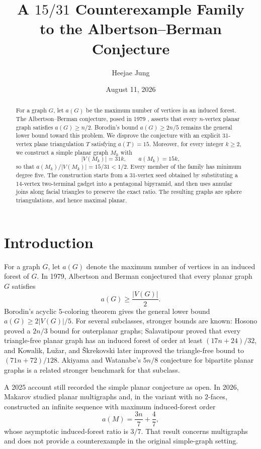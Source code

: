\documentclass[11pt]{article}
\title{A $15/31$ Counterexample Family\\
to the Albertson--Berman Conjecture}
\author{Heejae Jung}
\date{August 11, 2026}
\theoremstyle{definition}
\theoremstyle{remark}
\begin{document}
\maketitle

\begin{abstract}
For a graph $G$, let $a(G)$ be the maximum number of vertices in an induced forest.
The Albertson--Berman conjecture, posed in 1979 \cite{AlbertsonBerman1979}, asserts
that every $n$-vertex planar graph satisfies $a(G)\ge n/2$. 
Borodin's bound $a(G)\ge 2n/5$ remains the general lower bound 
toward this problem\cite{Borodin1979}.
We disprove the conjecture with an explicit 31-vertex plane 
triangulation $T$ satisfying $a(T)=15$. Moreover, for every integer
$k\ge2$, we construct a simple planar graph $M_k$ with
\[
 |V(M_k)|=31k,\qquad a(M_k)=15k,
\]
so that $a(M_k)/|V(M_k)|=15/31<1/2$.  Every member of the family has minimum
degree five.  The construction starts from a $31$-vertex seed obtained by
substituting a $14$-vertex two-terminal gadget into a pentagonal bipyramid, and
then uses annular joins along facial triangles to preserve the exact ratio.
The resulting graphs are sphere triangulations, and hence maximal planar.
\end{abstract}



\section{Introduction}
For a graph $G$, let $a(G)$ denote the maximum number of vertices in an induced
forest of $G$.  In 1979, Albertson and Berman conjectured that every planar graph
$G$ satisfies\cite{AlbertsonBerman1979}
\begin{equation}\label{eq:AB}
a(G) \ge \frac{|V(G)|}{2}.
\end{equation}
Borodin's acyclic $5$-coloring theorem gives the general lower bound
$a(G)\ge2|V(G)|/5$\cite{Borodin1979}.  For several subclasses, stronger bounds
are known: Hosono proved a $2n/3$ bound for outerplanar graphs\cite{Hosono1990};
Salavatipour proved that every triangle-free planar graph has an induced forest
of order at least $(17n+24)/32$\cite{Salavatipour2006}, and Kowalik, Lu\v{z}ar,
and \v{S}krekovski later improved the triangle-free bound to
$(71n+72)/128$\cite{KowalikLuzarSkrekovski2010}.  Akiyama and Watanabe's
$5n/8$ conjecture for bipartite planar graphs is a related stronger benchmark
for that subclass\cite{AkiyamaWatanabe1987}.

A 2025 account still recorded the simple planar conjecture as
open\cite{EnamiMatsumotoYashima2025}.  In 2026, Makarov studied planar
multigraphs and, in the variant with no $2$-faces, constructed an infinite
sequence with maximum induced-forest order
\[
 a(M)=\frac{3n}{7}+\frac{4}{7},
\]
whose asymptotic induced-forest ratio is $3/7$\cite{Makarov2026}.  That result
concerns multigraphs and does not provide a counterexample in the original
simple-graph setting.
\end{document}
